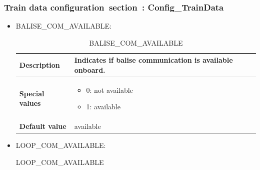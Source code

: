 \documentclass{template/openetcs}
\begin{document}
\subsubsection{Train data configuration section : Config\_TrainData}
	\begin{itemize}
		\item BALISE\_COM\_AVAILABLE:
		
			\begin{longtable}{|l|l|}
				\caption{BALISE\_COM\_AVAILABLE}\\ 
				\hline
				
					\begin{minipage}[t]{0.22\linewidth} \textbf{Description}	\end{minipage} 
				&	\begin{minipage}[t]{0.78\linewidth} Indicates if balise communication is available onboard. \end{minipage} \\
				
				\hline
																																									
					\begin{minipage}[t]{0.22\linewidth} \textbf{Special values}	\end{minipage} 
				&	\begin{minipage}[t]{0.78\linewidth} \begin{itemize} \item 0: not available \item 1: available \end{itemize} \end{minipage} \\
				
				\hline
				
					\begin{minipage}[t]{0.22\linewidth} \textbf{Default value}	\end{minipage} 
				&	\begin{minipage}[t]{0.78\linewidth} available \end{minipage} \\
				
				\hline
				
			\end{longtable}
			
		\item LOOP\_COM\_AVAILABLE:
				
			\begin{longtable}{|l|l|}
				\caption{LOOP\_COM\_AVAILABLE}\\ 
				\hline
				

\end{longtable}
\end{itemize}
\end{document}
